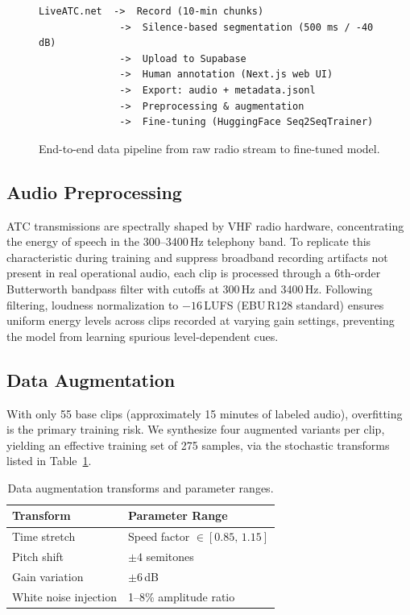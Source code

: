 \documentclass[11pt,a4paper]{article}
\begin{document}
\begin{figure}[h]
\centering
\small
\begin{verbatim}
LiveATC.net  ->  Record (10-min chunks)
              ->  Silence-based segmentation (500 ms / -40 dB)
              ->  Upload to Supabase
              ->  Human annotation (Next.js web UI)
              ->  Export: audio + metadata.jsonl
              ->  Preprocessing & augmentation
              ->  Fine-tuning (HuggingFace Seq2SeqTrainer)
\end{verbatim}
\caption{End-to-end data pipeline from raw radio stream to fine-tuned model.}
\label{fig:pipeline}
\end{figure}

\subsection{Audio Preprocessing}
\label{sec:preprocess}

ATC transmissions are spectrally shaped by VHF radio hardware, concentrating
the energy of speech in the 300--3400\,Hz telephony band. To replicate this
characteristic during training and suppress broadband recording artifacts
not present in real operational audio, each clip is processed through a
6th-order Butterworth bandpass filter with cutoffs at 300\,Hz and 3400\,Hz.
Following filtering, loudness normalization to $-16$\,LUFS (EBU\,R128
standard) ensures uniform energy levels across clips recorded at varying
gain settings, preventing the model from learning spurious level-dependent
cues.

\subsection{Data Augmentation}
\label{sec:augmentation}

With only 55 base clips (approximately 15 minutes of labeled audio),
overfitting is the primary training risk. We synthesize four augmented
variants per clip, yielding an effective training set of 275 samples, via
the stochastic transforms listed in Table~\ref{tab:augmentation}.

\begin{table}[h]
\centering
\caption{Data augmentation transforms and parameter ranges.}
\label{tab:augmentation}
\begin{tabular}{ll}
\toprule
\textbf{Transform} & \textbf{Parameter Range} \\
\midrule
Time stretch         & Speed factor $\in [0.85,\,1.15]$ \\
Pitch shift          & $\pm 4$ semitones \\
Gain variation       & $\pm 6$\,dB \\
White noise injection & 1--8\% amplitude ratio \\
\bottomrule
\end{tabular}
\end{table}
\end{document}
